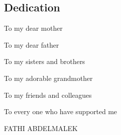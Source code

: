 \newenvironment{dedication}
{
	\thispagestyle{empty}
	\vspace*{\stretch{1}}
	\itshape
	\raggedleft
}
{\par
	\vspace{\stretch{3}}
	\clearpage
}
\begin{center}
	\section*{Dedication}
\end{center}
\begin{dedication}
	To my dear mother
	
	To my dear father
	
	To my sisters and brothers
	
	To my adorable grandmother
	
	To my friends and colleagues
	
	To every one who have supported me
	\par
	\vspace{2\baselineskip}
	
	\vspace{\baselineskip}
	FATHI ABDELMALEK
\end{dedication}